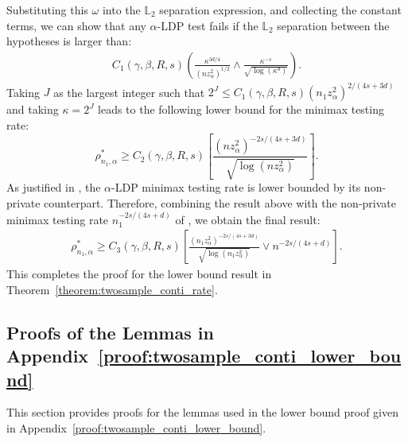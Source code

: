 \documentclass[twoside,11pt]{article}
\newcommand{\Ell}{\mathbb{L}}
\newcommand{\EllTwo}{\Ell_2} %
\newcommand{\dimDensity}{d} %
\newcommand{\sampleSize}{n}
\newcommand{\smoothness}{s}
\newcommand{\privacyParameter}{\alpha} %
\newcommand{\maxErrorTypeTwo}{\beta} %
\newcommand{\maxErrorTypeOne}{\gamma} %
\newcommand{\binNum}{\kappa}           %
\begin{document}
\begin{appendix}
\begin{equation*}
	\end{equation*}
	Substituting this $\omega$ into the $\EllTwo$ separation expression, and collecting the constant terms, 
	we can show that any $\privacyParameter$-LDP test fails if the $\EllTwo$ separation between the hypotheses is larger than:
	\begin{align*}
		C_1(\maxErrorTypeOne, \maxErrorTypeTwo, R, \smoothness)
		\left(
		\frac{\binNum^{3\dimDensity/4}
		}{(n z_\privacyParameter^2)^{1/2}}
		\wedge  
		\frac{\kappa^{-s}
		}{
			\sqrt{ \log({ \binNum^{\dimDensity}})}}
		\right).
	\end{align*}
	Taking $J$ as the largest integer such that
	$2^J \leq C_1(\gamma, \beta, R, \smoothness)(\sampleSize_1 z_\privacyParameter^2)^{2/(4\smoothness+3\dimDensity)}$ 
	and taking $\binNum = 2^J$ leads to the following lower bound for the minimax testing rate:
	\begin{equation*}
		\rho_{\sampleSize_1, \privacyParameter}^\ast
		\geq
		C_2(\gamma, \beta, R, \smoothness)
		\left[
		\frac{
			(n z_\privacyParameter^2)^{
				-2s/(4\smoothness+3\dimDensity)        }
		}{
			\sqrt{
				\log(n z_\privacyParameter^2)
			}
		}\right].
	\end{equation*}
	As justified in \citet{Lam-Weil2021MinimaxConstraint}, the $\privacyParameter$-LDP 
	minimax testing rate is lower bounded by its non-private counterpart.
	Therefore, combining the result above with the non-private minimax testing rate $\sampleSize_1^{
		-2s/(4s + \dimDensity)
	}$ of \citet{Arias-Castro2018RememberDimension},
	we obtain the final result:
	\begin{align*}
		\rho_{\sampleSize_1, \privacyParameter}^\ast
		\geq
		C_3(\gamma, \beta, R, \smoothness)
		\left[
		\frac{
			(\sampleSize_1 z_\privacyParameter^2)^{
				-2s/(4\smoothness+3\dimDensity)        }
		}{
			\sqrt{
				\log(\sampleSize_1 z_\privacyParameter^2)
			}
		}
		\vee
		n^{
			-2s/(4s + \dimDensity)
		}
		\right].
	\end{align*}
	This completes the proof for the lower bound result in Theorem~\ref{theorem:twosample_conti_rate}.
	\subsection{Proofs of the Lemmas in Appendix~\ref{proof:twosample_conti_lower_bound}}
	This section provides proofs for the lemmas used in the lower bound proof given in Appendix~\ref{proof:twosample_conti_lower_bound}.

\end{appendix}
\end{document}
